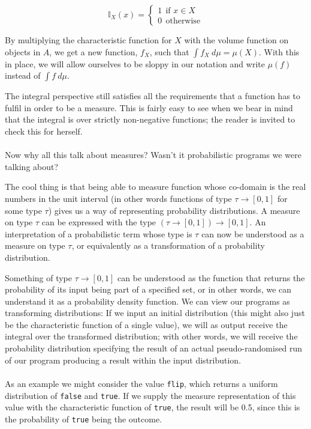 \documentclass[11pt, leqno, titlepage]{article}
\theoremstyle{definition}
\begin{document}
$$\mathbb{I}_X(x)=
\begin{cases}
  1~~\text{if }x\in X\\
  0~~\text{otherwise}
\end{cases}$$

By multiplying the characteristic function for $X$ with the volume function on
objects in $A$, we get a new function, $f_X$, such that $\int f_X~d\mu =
\mu(X)$. With this in place, we will allow ourselves to be sloppy in our notation and
write $\mu(f)$ instead of $\int f~d\mu$.

The integral perspective still satisfies all the requirements that a function has to
fulfil in order to be a measure. This is fairly easy to see when we bear in mind that
the integral is over strictly non-negative functions; the reader is invited to check
this for herself.\\
\\
Now why all this talk about measures? Wasn't it probabilistic programs we were
talking about?

The cool thing is that being able to measure function whose co-domain is the real
numbers in the unit interval (in other words functions of type $\tau\to[0,1]$ for
some type $\tau$) gives us a way of representing probability distributions. A measure
on type $\tau$ can be expressed with the type $(\tau\to[0,1])\to[0,1]$. An
interpretation of a probabilistic term whose type is $\tau$ can now be understood as
a measure on type $\tau$, or equivalently as a transformation of a probability
distribution.

Something of type $\tau\to[0,1]$ can be understood as the function that returns the
probability of its input being part of a specified set, or in other words, we can
understand it as a probability density function. We can view our programs as
transforming distributions: If we input an initial distribution (this might also just
be the characteristic function of a single value), we will as output receive the
integral over the transformed distribution; with other words, we will receive the
probability distribution specifying the result of an actual pseudo-randomised run of
our program producing a result within the input distribution.\\
\\
As an example we might consider the value \texttt{flip}, which returns a uniform
distribution of \texttt{false} and \texttt{true}. If we supply the measure
representation of this value with the characteristic function of \texttt{true}, the
result will be 0.5, since this is the probability of \texttt{true} being the
outcome.
\end{document}
